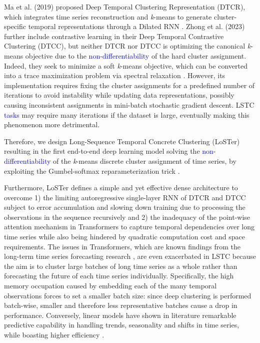 \documentclass[times, review, 10pt]{elsarticle}
\begin{document}
Ma et al. (2019) \cite{ma2019learning} proposed Deep Temporal Clustering Representation (DTCR), which integrates time series reconstruction and \textit{k}-means to generate cluster-specific temporal representations through a Dilated RNN \cite{chang2017dilated}. Zhong et al. (2023) \cite{zhong2023deep} further include contrastive learning in their Deep Temporal Contrastive Clustering (DTCC), but neither DTCR nor DTCC is optimizing the canonical \textit{k}-means objective due to the \textcolor{blue}{non-differentiability} of the hard cluster assignment. Indeed, they seek to minimize a soft \textit{k}-means objective, which can be converted into a trace maximization problem via spectral relaxation \cite{zha2001spectral}. However, its implementation requires fixing the cluster assignments for a predefined number of iterations to avoid instability while updating data representations, possibly causing inconsistent assignments in mini-batch stochastic gradient descent. LSTC \textcolor{blue}{tasks} may require many iterations if the dataset is large, eventually making this phenomenon more detrimental.

Therefore, we design Long-Sequence Temporal Concrete Clustering (LoSTer) resulting in the first end-to-end deep learning model solving the \textcolor{blue}{non-differentiability} of the \textit{k}-means discrete cluster assignment of time series, by exploiting the Gumbel-softmax reparameterization trick \cite{jang2017categorical}.

Furthermore, LoSTer defines a simple and yet effective dense architecture to overcome 1) the limiting autoregressive single-layer RNN of DTCR and DTCC subject to error accumulation and slowing down training due to processing the observations in the sequence recursively and 2) the inadequacy of the point-wise attention mechanism in Transformers to capture temporal dependencies over long time series while also being hindered by quadratic computation cost and space requirements. The issues in Transformers, which are known findings from the long-term time series forecasting research \cite{zeng2023transformers}, are even exacerbated in LSTC because the aim is to cluster large batches of long time series as a whole rather than forecasting the future of each time series individually. Specifically, the high memory occupation caused by embedding each of the many temporal observations forces to set a smaller batch size: since deep clustering is performed batch-wise, smaller and therefore less representative batches cause a drop in performance. Conversely, linear models have shown in literature remarkable predictive capability in handling trends, seasonality and shifts in time series, while boasting higher efficiency \cite{zeng2023transformers,li2023revisiting}.
\end{document}
